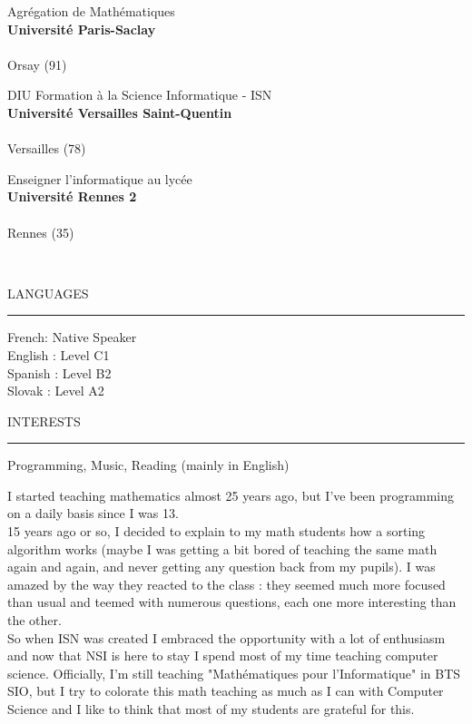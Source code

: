 \documentclass[12pt,a4paper,article,english,firamath]{nsi}
\begin{document}
\begin{multicols}{2}
\bigskip Agrégation de Mathématiques \\
{\color{UGLiBlue}\textbf{Université Paris-Saclay}}\\
{\color{lightgray}\\ \faMapMarker* Orsay (91)}

\bigskip DIU Formation à la Science Informatique - ISN \\
{\color{UGLiBlue}\textbf{Université Versailles Saint-Quentin}}\\
{\color{lightgray}\\ \faMapMarker* Versailles (78)}

\bigskip Enseigner l'informatique au lycée \\
{\color{UGLiBlue}\textbf{Université Rennes 2}}\\
{\color{lightgray}\\ \faMapMarker* Rennes (35)}

\end{multicols}
\ \\
\begin{multicols}{2}
{\color{UGLiBlue}\large\titlefont LANGUAGES\\[-1em]\hrule}
\medskip 
French: Native Speaker\\
English : Level C1\\
Spanish : Level B2\\
Slovak : Level A2\\

\columnbreak

{\color{UGLiBlue}\large\titlefont INTERESTS\\[-1em]\hrule}
\medskip 
Programming, Music, Reading (mainly in English)

\end{multicols}
\newpage
I started teaching mathematics almost 25 years ago, but I've been programming on a daily basis since I was 13.\\
15 years ago or so, I decided to explain to my math students how a sorting algorithm works (maybe I was getting a bit bored of teaching the same math again and again, and never getting any question back from my pupils). I was amazed by the way they reacted to the class : they seemed much more focused than usual and teemed with numerous questions, each one more interesting than the other.\\
So when ISN was created I embraced the opportunity with a lot of enthusiasm and now that NSI is here to stay I spend most of my time teaching computer science. Officially, I'm still teaching "Mathématiques pour l'Informatique" in BTS SIO, but I try to colorate this math teaching as much as I can with Computer Science and I like to think that most of my students are grateful for this.\\
\end{document}
